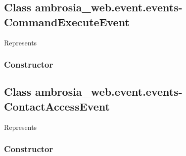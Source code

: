 \documentclass[letterpaper,10pt,english]{sphinxmanual}
\begin{document}
\begin{fulllineitems}
\label{ambrosia_web.event.events-CallLogAccessEvent:ambrosia_web.event.events-CallLogAccessEvent}
\end{fulllineitems}



\subsection{Class ambrosia\_web.event.events-CommandExecuteEvent}
\label{ambrosia_web.event.events-CommandExecuteEvent::doc}\label{ambrosia_web.event.events-CommandExecuteEvent:class-ambrosia-web-event-events-commandexecuteevent}
Represents {\hyperref[ambrosia_plugins.lkm:ambrosia_plugins.lkm.events.CommandExecuteEvent]{}}


\subsubsection{Constructor}
\label{ambrosia_web.event.events-CommandExecuteEvent:constructor}

\begin{fulllineitems}
\label{ambrosia_web.event.events-CommandExecuteEvent:ambrosia_web.event.events-CommandExecuteEvent}
\end{fulllineitems}



\subsection{Class ambrosia\_web.event.events-ContactAccessEvent}
\label{ambrosia_web.event.events-ContactAccessEvent::doc}\label{ambrosia_web.event.events-ContactAccessEvent:class-ambrosia-web-event-events-contactaccessevent}
Represents {\hyperref[ambrosia_plugins.apimonitor:ambrosia_plugins.apimonitor.ContactAccessEvent]{}}


\subsubsection{Constructor}
\label{ambrosia_web.event.events-ContactAccessEvent:constructor}
\end{document}
